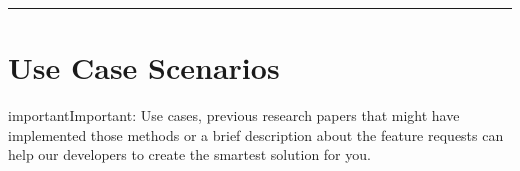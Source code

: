 \documentclass[letterpaper,10pt,english]{sphinxmanual}
\begin{document}
\bigskip\hrule\bigskip



\section{Use Case Scenarios}
\label{\detokenize{7_issues_bugs_requests:use-case-scenarios}}
\begin{sphinxadmonition}{important}{Important:}
Use cases, previous research papers that might have implemented those methods or a brief description about the feature requests can help our developers to create the smartest solution for you.
\end{sphinxadmonition}



\renewcommand{\indexname}{Index}
\printindex
\end{document}
